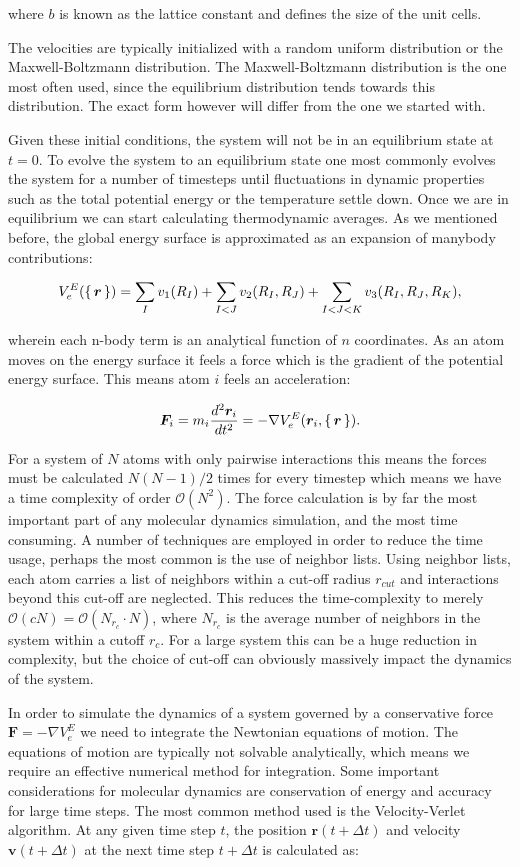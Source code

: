 where $b$ is known as the lattice constant and defines
the size of the unit cells.
\par
The velocities are typically initialized with a random uniform
distribution or the Maxwell-Boltzmann distribution.
The Maxwell-Boltzmann distribution is the one most often used,
since the equilibrium distribution tends towards this distribution.
The exact form however will differ from the one we started with.
\par
Given these initial conditions, the system will not be in an
equilibrium state at $t=0$. To evolve the system
to an equilibrium state one most commonly evolves the system
for a number of timesteps until fluctuations in dynamic
properties such as the total potential energy or the temperature
settle down. Once we are in equilibrium we can start calculating
thermodynamic averages.
\newline
\newline
As we mentioned before, the global energy surface
is approximated as an expansion of manybody contributions:

$$ V_e^E(\set{\bm{r}}) = 
    \sum_I v_1(R_I) + \sum_{I < J} v_2(R_I, R_J)
    + \sum_{I < J < K} v_3(R_I, R_J, R_K) , $$

wherein each n-body term is an analytical function
of $n$ coordinates.
As an atom moves on the energy surface
it feels a force which is the gradient of the potential energy surface.
This means atom $i$ feels an acceleration:

$$ \bm{F}_i = m_i \frac{d^2 \bm{r}_i}{dt^2} =
    -\nabla V_e^E(\bm{r}_i, \set{\bm{r}}) . $$

For a system of $N$ atoms with only pairwise interactions
this means the forces must be calculated $N(N-1)/2$ times
for every timestep which means we have a time complexity
of order $\mathcal{O}(N^2)$. The force calculation is by far
the most important part of any molecular dynamics simulation,
and the most time consuming.
A number of techniques are employed in order to reduce
the time usage, perhaps the most common is the use of neighbor
lists. Using neighbor lists, each atom carries a list of neighbors
within a cut-off radius $r_{cut}$ and interactions
beyond this cut-off are neglected.
This reduces the time-complexity to merely 
$\mathcal{O}(cN) = \mathcal{O}(N_{r_c} \cdot N)$,
where $N_{r_c}$ is the average number of neighbors in the system
within a cutoff $r_c$. For a large system this can be a
huge reduction in complexity, but the choice of cut-off
can obviously massively impact the dynamics of the system.
\par
In order to simulate the dynamics of a system governed by
a conservative force $\bm{F} = - \nabla V_e^E$
we need to integrate the Newtonian equations of motion.
The equations of motion are typically not solvable
analytically, which means we require an effective numerical
method for integration. Some important considerations
for molecular dynamics are conservation of energy
and accuracy for large time steps.
The most common method used is the Velocity-Verlet algorithm.
At any given time step $t$, the position $\bm{r}(t + \Delta t)$
and velocity $\bm{v}(t + \Delta t)$ at the next time step
$t + \Delta t$ is calculated as:

